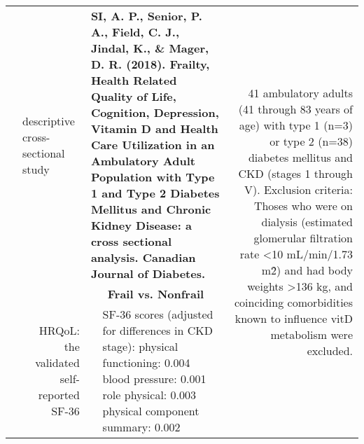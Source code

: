 \documentclass[jou]{apa6}
\begin{document}
\begin{table}[htbp]
\begin{tabular}{rrp{17.75em}p{20.7em}r}
          & \multicolumn{1}{l}{\cellcolor[rgb]{ .929,  .733,  .706}descriptive cross-sectional study} & \multicolumn{2}{p{38.45em}}{\cellcolor[rgb]{ .745,  .749,  .894}\textbf{SI, A. P., Senior, P. A., Field, C. J., Jindal, K., \& Mager, D. R. (2018). Frailty, Health Related Quality of Life, Cognition, Depression, Vitamin D and Health Care Utilization in an Ambulatory Adult Population with Type 1 and Type 2 Diabetes Mellitus and Chronic Kidney Disease: a cross sectional analysis. Canadian Journal of Diabetes.}} & \multicolumn{1}{r}{\multirow{3}[0]{*}{\cellcolor[rgb]{ .929,  .733,  .706}41 ambulatory adults (41 through 83 years of age) with type 1 (n=3) or type 2 (n=38) diabetes mellitus and CKD (stages 1 through V).  \newline{}Exclusion criteria: Thoses who were on dialysis  (estimated glomerular filtration rate <10 mL/min/1.73 m\^2) and had body weights >136 kg, and coinciding comorbidities known to influence vitD metabolism were excluded.}} \\
          & \cellcolor[rgb]{ .929,  .733,  .706} & \multicolumn{2}{c}{\cellcolor[rgb]{ .929,  .733,  .706}\textbf{Frail vs. Nonfrail}} &  \\
          & \multicolumn{1}{p{20.35em}}{\cellcolor[rgb]{ .929,  .733,  .706}HRQoL: the validated self-reported SF-36} & \multicolumn{1}{r}{\cellcolor[rgb]{ .984,  .898,  .839}} & \cellcolor[rgb]{ .984,  .898,  .839}SF-36 scores (adjusted for differences in CKD stage): \newline{} physical functioning: 0.004\newline{} blood pressure: 0.001\newline{} role physical: 0.003\newline{} physical component summary: 0.002 &  \\

\end{tabular}
\end{table}
\end{document}
